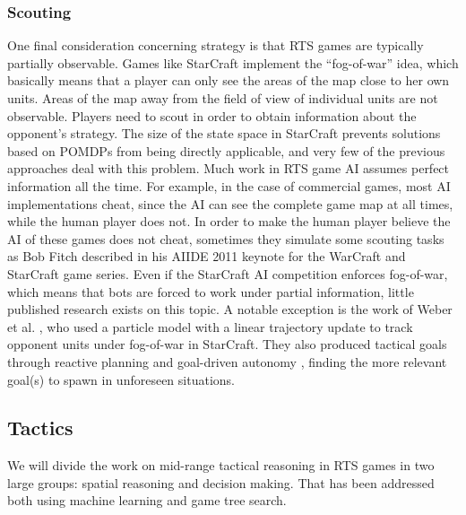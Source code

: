 \documentclass{llncs}
\begin{document}
\subsubsection*{Scouting}
One  final consideration  concerning strategy  is that  RTS games  are
typically  partially observable.  Games like  StarCraft implement  the
``fog-of-war'' idea, which basically means  that a player can only see
the areas  of the map close  to her own  units. Areas of the  map away
from the field of view of individual units are not observable. Players
need  to scout  in order  to obtain  information about  the opponent's
strategy. The size of the  state space in StarCraft prevents solutions
based on  POMDPs from being directly  applicable, and very few  of the
previous approaches deal  with this problem. Much work in  RTS game AI
assumes perfect information all the time.  For example, in the case of
commercial games, most AI implementations  cheat, since the AI can see
the  complete game  map  at all  times, while  the  human player  does
not. In order to  make the human player believe the  AI of these games
does not  cheat, sometimes  they simulate some  scouting tasks  as Bob
Fitch  described  in his  AIIDE  2011  keynote  for the  WarCraft  and
StarCraft game series.  Even if the StarCraft  AI competition enforces
fog-of-war, which  means that  bots are forced  to work  under partial
information, little published research exists on this topic. A notable
exception is the work of Weber  et al. \cite{WeberAIIDE11}, who used a
particle model with a linear trajectory update to track opponent units
under  fog-of-war  in StarCraft.  They  also  produced tactical  goals
through     reactive     planning     and     goal-driven     autonomy
\cite{WeberCig10,Weber10}, finding the more  relevant goal(s) to spawn
in unforeseen situations.


\subsection*{Tactics}

We will divide the work on mid-range tactical reasoning in RTS games in two
large groups: spatial reasoning and decision making. That has been addressed both using machine learning and game tree search.
\end{document}
